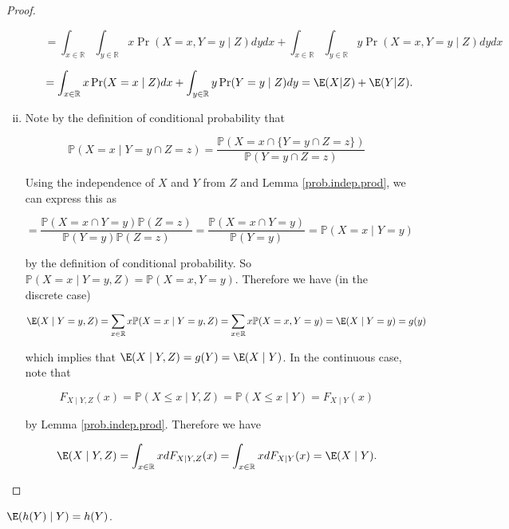 \begin{proof}
\begin{enumerate}[(i)]
\begin{itemize}
\[
= \int_{x  \in \mathbb{R}} \int_{y \in \mathbb{R}} x\Pr(X = x, Y = y \mid Z) dy dx + \int_{x  \in \mathbb{R}} \int_{y \in \mathbb{R}} y \Pr(X = x, Y = y \mid Z) dy dx
\]

\[
 = \int_{x \in \mathbb{R}} x \Pr(X = x \mid Z) dx+ \int_{y \in \mathbb{R}} y \Pr(Y = y \mid Z)dy =\E(X|Z)+\E(Y|Z).
\]


\end{itemize}

\item  Note by the definition of conditional probability that

\[
\mathbb{P}(X =x \mid Y = y \cap Z = z) = \frac{\mathbb{P}(X = x \cap \{Y = y \cap Z = z \})}{\mathbb{P}(Y = y \cap Z = z)}
\]

Using the independence of \(X\) and \(Y\) from \(Z\) and Lemma \ref{prob.indep.prod}, we can express this as

\[
= \frac{\mathbb{P}(X = x \cap Y = y ) \mathbb{P}( Z = z )}{\mathbb{P}(Y = y) \mathbb{P}( Z = z)} = \frac{\mathbb{P}(X = x \cap Y = y )} {\mathbb{P}(Y = y) } = \mathbb{P}(X =x \mid Y = y)
\]

by the definition of conditional probability. So \(\mathbb{P}(X = x \mid Y = y, Z) = \mathbb{P}(X = x, Y =y)\). Therefore we have (in the discrete case)

\[
\E(X \mid Y = y , Z) = \sum_{x \in \mathbb{R}} x \mathbb{P}(X = x \mid Y = y, Z) = \sum_{x \in \mathbb{R}} x  \mathbb{P}(X = x, Y =y) = \E(X \mid Y =y) = g(y)
\]

which implies that \(\E(X \mid Y , Z)  = g(Y) = \E(X \mid Y)\). In the continuous case, note that 

\[
F_{X \mid Y, Z}(x) = \mathbb{P}(X \leq x \mid Y, Z) = \mathbb{P}(X \leq x \mid Y) = F_{X \mid Y}(x)
\]

by Lemma \ref{prob.indep.prod}. Therefore we have

\[
\E(X \mid Y  , Z) = \int_{x \in \mathbb{R}} x dF_{X \mid Y, Z}(x) = \int_{x \in \mathbb{R}} x  dF_{X \mid Y}(x) = \E(X \mid Y ) .
\]

\end{enumerate}



\end{proof}

\begin{corollary}\label{prob.cor.cond.exp.on.func}

\end{corollary} \( \E(h(Y) \mid Y) = h(Y)\).

